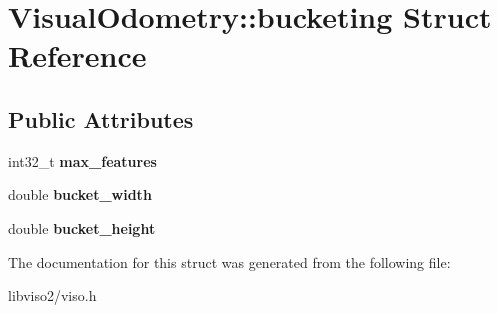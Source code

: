 \hypertarget{struct_visual_odometry_1_1bucketing}{\section{Visual\+Odometry\+:\+:bucketing Struct Reference}
\label{struct_visual_odometry_1_1bucketing}
}
\subsection*{Public Attributes}
\begin{DoxyCompactItemize}
\item 
\hypertarget{struct_visual_odometry_1_1bucketing_a7270d0e14c83b0ecd5af4d502a761005}{int32\+\_\+t {\bfseries max\+\_\+features}}\label{struct_visual_odometry_1_1bucketing_a7270d0e14c83b0ecd5af4d502a761005}

\item 
\hypertarget{struct_visual_odometry_1_1bucketing_af811ffa82dd6a40b431f52f45ee762dd}{double {\bfseries bucket\+\_\+width}}\label{struct_visual_odometry_1_1bucketing_af811ffa82dd6a40b431f52f45ee762dd}

\item 
\hypertarget{struct_visual_odometry_1_1bucketing_af3e584ce1bed835aa264f1beb9f8075c}{double {\bfseries bucket\+\_\+height}}\label{struct_visual_odometry_1_1bucketing_af3e584ce1bed835aa264f1beb9f8075c}

\end{DoxyCompactItemize}


The documentation for this struct was generated from the following file\+:\begin{DoxyCompactItemize}
\item 
libviso2/viso.\+h\end{DoxyCompactItemize}
